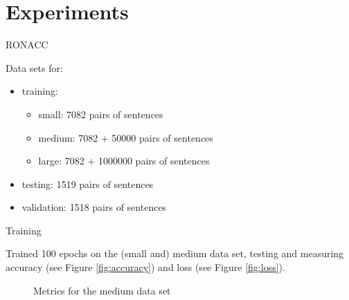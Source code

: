 \documentclass[]{beamer}
\begin{document}
    \section{Experiments}
        
        \begin{frame}{RONACC}
            
            Data sets for:
            \begin{itemize}
                \item training:
                \begin{itemize}
                    \item small: 7082 pairs of sentences
                    \item medium: 7082 + 50000 pairs of sentences
                    \item large: 7082 + 1000000 pairs of sentences
                \end{itemize}
                \item testing: 1519 pairs of sentences
                \item validation: 1518 pairs of sentences
            \end{itemize}
            
        \end{frame}
        
        \begin{frame}{Training}
            
            Trained 100 epochs on the (small and) medium data set, testing and measuring accuracy (see Figure \ref{fig:accuracy}) and loss (see Figure \ref{fig:loss}).
            
            \begin{figure}[]
                \centering
                \hfill
                \caption{Metrics for the medium data set}
                \label{fig:metrics}
            \end{figure}
            
        \end{frame}
        
\end{document}
